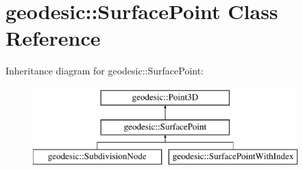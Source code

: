 \hypertarget{classgeodesic_1_1_surface_point}{}\section{geodesic\+:\+:Surface\+Point Class Reference}
\label{classgeodesic_1_1_surface_point}
Inheritance diagram for geodesic\+:\+:Surface\+Point\+:\begin{figure}[H]
\begin{center}
\leavevmode
\includegraphics[height=3.000000cm]{classgeodesic_1_1_surface_point}
\end{center}
\end{figure}
